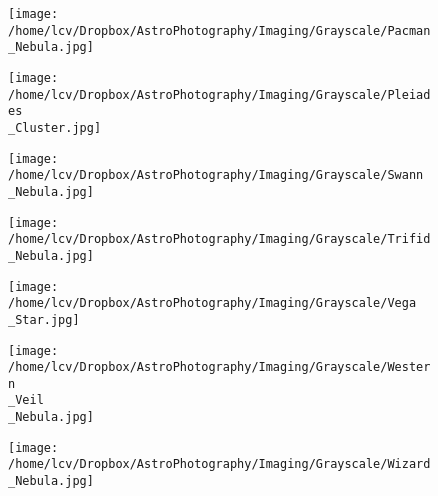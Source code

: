\newpage
\begin{figure}[phbt]
	\texttt{[image: /home/lcv/Dropbox/AstroPhotography/Imaging/Grayscale/Pacman\\\_Nebula.jpg]}


\end{figure}
\newpage
\begin{figure}[phbt]
	\texttt{[image: /home/lcv/Dropbox/AstroPhotography/Imaging/Grayscale/Pleiades\\\_Cluster.jpg]}


\end{figure}
\newpage
\begin{figure}[phbt]
	\texttt{[image: /home/lcv/Dropbox/AstroPhotography/Imaging/Grayscale/Swann\\\_Nebula.jpg]}


\end{figure}
\newpage
\begin{figure}[phbt]
	\texttt{[image: /home/lcv/Dropbox/AstroPhotography/Imaging/Grayscale/Trifid\\\_Nebula.jpg]}


\end{figure}
\newpage
\begin{figure}[phbt]
	\texttt{[image: /home/lcv/Dropbox/AstroPhotography/Imaging/Grayscale/Vega\\\_Star.jpg]}


\end{figure}
\newpage
\begin{figure}[phbt]
	\texttt{[image: /home/lcv/Dropbox/AstroPhotography/Imaging/Grayscale/Western\\\_Veil\\\_Nebula.jpg]}


\end{figure}
\newpage
\begin{figure}[phbt]
	\texttt{[image: /home/lcv/Dropbox/AstroPhotography/Imaging/Grayscale/Wizard\\\_Nebula.jpg]}


\end{figure}
\newpage
